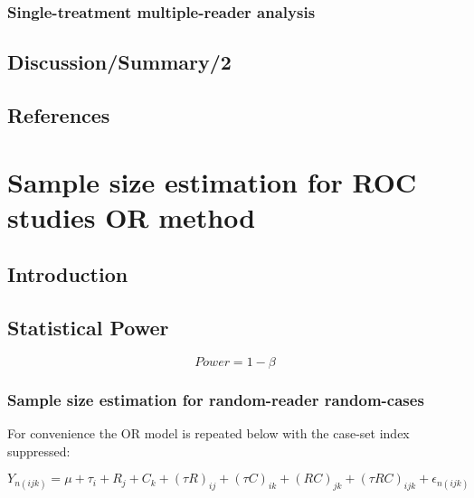 \documentclass[
]{book}
\begin{document}
\hypertarget{RocSampleSizeDBM-STMRAnalysis}{%
\subsection{Single-treatment multiple-reader analysis}\label{RocSampleSizeDBM-STMRAnalysis}}

\hypertarget{discussionsummary2}{%
\section{Discussion/Summary/2}\label{discussionsummary2}}

\hypertarget{RocSampleSizeDBM-references}{%
\section{References}\label{RocSampleSizeDBM-references}}

\hypertarget{RocSampleSizeOR}{%
\chapter{Sample size estimation for ROC studies OR method}\label{RocSampleSizeOR}}

\hypertarget{RocSampleSizeOR-introduction}{%
\section{Introduction}\label{RocSampleSizeOR-introduction}}

\hypertarget{StatPower2}{%
\section{Statistical Power}\label{StatPower2}}

\begin{equation}
Power = 1 - \beta
\label{eq:DefinitionStatPower1}
\end{equation}

\hypertarget{sample-size-estimation-for-random-reader-random-cases}{%
\subsection{Sample size estimation for random-reader random-cases}\label{sample-size-estimation-for-random-reader-random-cases}}

For convenience the OR model is repeated below with the case-set index suppressed:

\begin{equation}
Y_{n(ijk)}=\mu+\tau_i+R_j+C_k+(\tau R)_{ij}+(\tau C)_{ik}+(RC)_{jk}+(\tau RC)_{ijk}+\epsilon_ {n(ijk)}
\label{eq:ORModelSsOR}
\end{equation}
\end{document}
